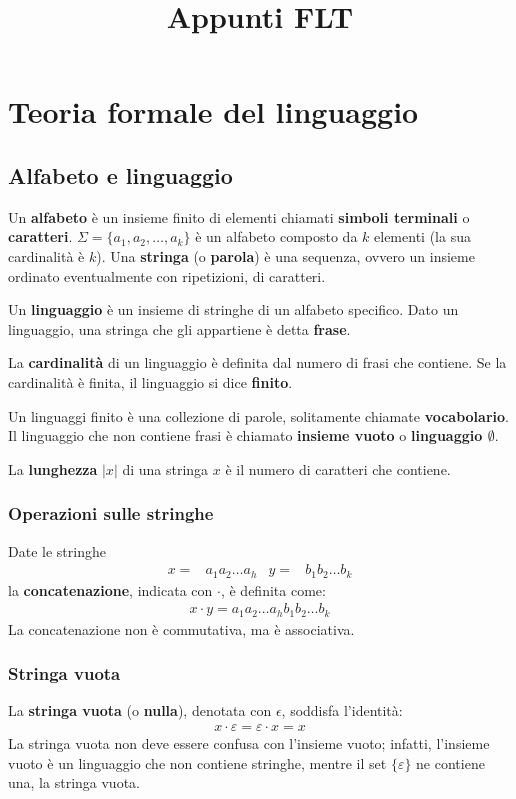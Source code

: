 \documentclass[11pt]{article}
\title{Appunti FLT}
\begin{document}
\section{Teoria formale del linguaggio}
\subsection{Alfabeto e linguaggio}
Un \textbf{alfabeto} è un insieme finito di elementi chiamati \textbf{simboli terminali} o \textbf{caratteri}.
$\Sigma=\{a_1,a_2,\dots,a_k\}$ è un alfabeto composto da $k$ elementi (la sua cardinalità è $k$). Una \textbf{stringa} (o 
\textbf{parola}) è una sequenza, ovvero un insieme ordinato eventualmente con ripetizioni, di caratteri.

Un \textbf{linguaggio} è un insieme di stringhe di un alfabeto specifico. Dato un linguaggio, una stringa che gli appartiene 
è detta \textbf{frase}. 

La \textbf{cardinalità} di un linguaggio è definita dal numero di frasi che contiene. Se la cardinalità è finita, il linguaggio 
si dice \textbf{finito}. 

Un linguaggi finito è una collezione di parole, solitamente chiamate \textbf{vocabolario}. Il linguaggio che non contiene 
frasi è chiamato \textbf{insieme vuoto} o \textbf{linguaggio $\emptyset$}.

La \textbf{lunghezza} $|x|$ di una stringa $x$ è il numero di caratteri che contiene.
\subsubsection{Operazioni sulle stringhe}
Date le stringhe
\begin{align*}
    x=&a_1a_2\dots a_h   &   y=&b_1b_2\dots b_k
\end{align*}
la \textbf{concatenazione}, indicata con $\cdot$, è definita come:
\begin{align*}
    x\cdot y=a_1a_2\dots a_hb_1b_2\dots b_k
\end{align*}
La concatenazione non è commutativa, ma è associativa.
\subsubsection{Stringa vuota}
La \textbf{stringa vuota} (o \textbf{nulla}), denotata con $\epsilon$, soddisfa l'identità:
\begin{align*}
    x\cdot \varepsilon=\varepsilon \cdot x = x
\end{align*}
La stringa vuota non deve essere confusa con l'insieme vuoto; infatti, l'insieme vuoto è un linguaggio che non contiene 
stringhe, mentre il set $\{\varepsilon\}$ ne contiene una, la stringa vuota.
\end{document}
